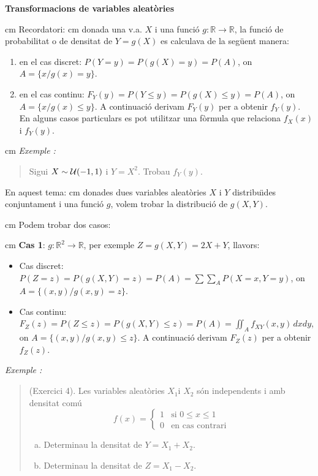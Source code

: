 \documentclass{article}
\newcommand\R{\mathbb{R}}
\newcounter{exctr}
\newenvironment{exemple}
{ \stepcounter{exctr} 
\hspace{0.2cm} 
\textit{Exemple  \arabic{exctr}: }
\it
\begin{quotation}
}{\end{quotation}}
\begin{document}
\noindent
\textbf{\large Transformacions de variables aleat\`ories}

 cm
\noindent
Recordatori:
 cm
donada una v.a. $X$ i una funci\'o $g:\R \rightarrow \R$, la funci\'o de probabilitat
o de densitat de $Y=g(X)$ es calculava de la seg\"uent manera:
\begin{enumerate}[1)]
\item en el cas discret: $P(Y=y)=P(g(X)=y)=P(A)$, on $A=\{x / g(x)=y\}$.
\item en el cas continu: $F_Y(y)=P(Y \leq y)=P(g(X) \leq y)=P(A)$, on $A=\{x / g(x) \leq y\}$. A continuaci\'o
derivam $F_Y(y)$ per a obtenir $f_Y(y)$. En alguns casos particulars es pot utilitzar una f\`ormula
que relaciona $f_X(x)$ i $f_Y(y)$.
\end{enumerate}

 cm
\begin{exemple}
Sigui $X \sim {\cal U}(-1, 1)$ i $Y=X^2$. Trobau $f_Y(y)$.
\end{exemple}

\vskip 1cm
\noindent
En aquest tema:
 cm
donades dues variables aleat\`ories $X$ i $Y$ distribu\"\i des conjuntament i una funci\'o $g$,
volem trobar la distribuci\'o de $g(X, Y)$.

 cm
\noindent
Podem trobar dos casos:

 cm
\noindent
\textbf{Cas 1}: $g:\R^2 \rightarrow \R$, per exemple $Z=g(X, Y)=2X+Y$, llavors:
\begin{itemize}
\item Cas discret: $P(Z=z)=P(g(X, Y)=z)=P(A)=\sum\sum_A P(X=x, Y=y)$, on $A=\{ (x, y) / g(x, y) = z\}$.
\vskip 0.4cm
\item Cas continu: $F_Z(z)=P(Z \leq z)=P(g(X, Y) \leq z)=P(A)=\iint_A f_{XY}(x, y) \, dxdy$, 
on $A=\{ (x, y) / g(x, y) \leq z\}$.
A continuaci\'o derivam $F_Z(z)$ per a obtenir $f_Z(z)$.
\end{itemize}

\vskip 1cm
\begin{exemple}
(Exercici 4). Les variables aleat\`ories $X_1 \mbox{i } X_2$ s\'on independents
i amb densitat com\'u 
\[
f(x) = \begin{cases}1 & \text{si } 0 \leq x \leq 1 \\ 
0 & \text{en cas contrari} \end{cases}
\]
\begin{enumerate}[a)]
\item Determinau la densitat de $Y = X_1 + X_2.$
\item Determinau la densitat de $Z = X_1 - X_2.$
\end{enumerate}
\end{exemple}
\end{document}

